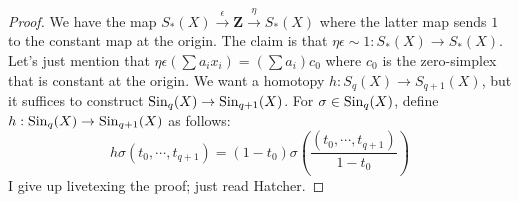 		\begin{proof}
		We have the map $S_\ast(X)\xrightarrow{\epsilon}\mathbf{Z}\xrightarrow{\eta}S_\ast(X)$ where the latter map sends $1$ to the constant map at the origin. The claim is that $\eta\epsilon\sim 1:S_\ast(X)\to S_\ast(X)$. Let's just mention that $\eta\epsilon(\sum a_ix_i)=(\sum a_i)c_0$ where $c_0$ is the zero-simplex that is constant at the origin. We want a homotopy $h:S_q(X)\to S_{q+1}(X)$, but it suffices to construct $\mathrm{Sin}_q(X)\to \mathrm{Sin}_{q+1}(X)$. For $\sigma\in\mathrm{Sin}_q(X)$, define $h:\mathrm{Sin}_q(X)\to\mathrm{Sin}_{q+1}(X)$ as follows:
		$$h\sigma(t_0,\cdots,t_{q+1})=(1-t_0)\sigma\left(\frac{(t_0,\cdots,t_{q+1})}{1-t_0}\right)$$
		I give up livetexing the proof; just read Hatcher.
		\end{proof}
